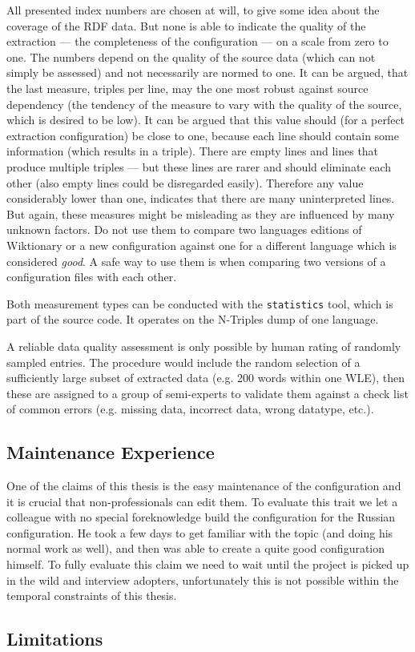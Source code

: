 All presented index numbers are chosen at will, to give some idea about the coverage of the RDF data. 
But none is able to indicate the quality of the extraction --- the completeness of the configuration --- on a scale from zero to one. 
The numbers depend on the quality of the source data (which can not simply be assessed) and not necessarily are normed to one.
It can be argued, that the last measure, triples per line, may the one most robust against source dependency (the tendency of the measure to vary with the quality of the source, which is desired to be low). 
It can be argued that this value should (for a perfect extraction configuration) be close to one, because each line should contain some information (which results in a triple). 
There are empty lines and lines that produce multiple triples --- but these lines are rarer and should eliminate each other (also empty lines could be disregarded easily). 
Therefore any value considerably lower than one, indicates that there are many uninterpreted lines. 
But again, these measures might be misleading as they are influenced by many unknown factors. 
Do not use them to compare two languages editions of Wiktionary or a new configuration against one for a different language which is considered \textit{good}.
A safe way to use them is when comparing two versions of a configuration files with each other.

Both measurement types can be conducted with the \texttt{statistics} tool, which is part of the source code. 
It operates on the N-Triples dump of one language. 

A reliable data quality assessment is only possible by human rating of randomly sampled entries. 
The procedure would include the random selection of a sufficiently large subset of extracted data (e.g. 200 words within one WLE), then these are assigned to a group of semi-experts to validate them against a check list of common errors (e.g. missing data, incorrect data, wrong datatype, etc.).

\subsection{Maintenance Experience}
One of the claims of this thesis is the easy maintenance of the configuration and it is crucial that non-professionals can edit them. 
To evaluate this trait we let a colleague with no special foreknowledge build the configuration for the Russian configuration. 
He took a few days to get familiar with the topic (and doing his normal work as well), and then was able to create a quite good configuration himself. 
To fully evaluate this claim we need to wait until the project is picked up in the wild and interview adopters, unfortunately this is not possible within the temporal constraints of this thesis.

\subsection{Limitations}


\newpage
